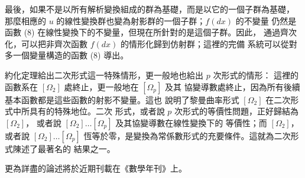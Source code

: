 \documentclass[11pt]{article}
\begin{document}
最後，如果不是以所有解析變換組成的群為基礎，而是以它的一個子群為基礎，
那麼相應的 \(u\) 的線性變換群也變為射影群的一個子群；\(f(dx)\) 的不變量
仍然是函數 (8) 在線性變換下的不變量，但現在所針對的是這個子群。因此，
通過齊次化，可以把非齊次函數 \(f(dx)\) 的情形化歸到仿射群；這裡的完備
系統可以從對多一個變量構造的函數 (8) 導出。

約化定理給出二次形式這一特殊情形，更一般地也給出 \(p\) 次形式的情形：
這裡的函數系在 \([\Omega_2]\) 處終止，更一般地在 \([\Omega_p]\) 及其
協變導數處終止，因為所有後續基本函數都是這些函數的射影不變量。這也
說明了黎曼曲率形式 \([\Omega_2]\) 在二次形式中所具有的特殊地位。二次
形式，或者說 \(p\) 次形式的等價性問題，正好歸結為 \([\Omega_2]\)，
或者說 \([\Omega_2]\ldots[\Omega_p]\) 及其協變導數在線性變換下的
等價性；而 \([\Omega_2]\)，或者說 \([\Omega_2]\ldots[\Omega_p]\)
恆等於零，是變換為常係數形式的充要條件。這就為二次形式陳述了最著名的
結果之一。

更為詳盡的論述將於近期刊載在《數學年刊》上。

\clearpage
\setcounter{footnote}{0}
\end{document}

